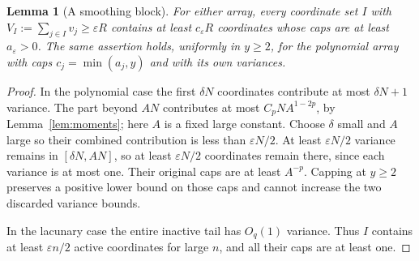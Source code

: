 \documentclass[11pt,a4paper]{article}
\numberwithin{equation}{section}
\newtheorem{lemma}[theorem]{Lemma}
\theoremstyle{definition}
\theoremstyle{remark}
\newcommand{\eps}{\varepsilon}
\begin{document}
\begin{lemma}[A smoothing block]
\label{lem:smoothing}
For either array, every coordinate set $I$ with
$V_I:=\sum_{j\in I}v_j\ge\eps R$ contains at least $c_\eps R$
coordinates whose caps are at least $a_\eps>0$. The same assertion
holds, uniformly in $y\ge2$, for the polynomial array with caps
$c_j=\min(a_j,y)$ and with its own variances.
\end{lemma}
\begin{proof}
In the polynomial case the first $\delta N$ coordinates contribute
at most $\delta N+1$ variance. The part beyond $AN$ contributes at
most $C_pNA^{1-2p}$, by Lemma~\ref{lem:moments}; here $A$ is a
fixed large constant. Choose $\delta$
small and $A$ large so their combined contribution is less than
$\eps N/2$. At least $\eps N/2$ variance remains in
$[\delta N,AN]$, so at least $\eps N/2$ coordinates remain there,
since each variance is at most one. Their original caps are at least
$A^{-p}$. Capping at $y\ge2$ preserves a positive lower bound on
those caps and cannot increase the two discarded variance bounds.

In the lacunary case the entire inactive tail has $O_q(1)$ variance.
Thus $I$ contains at least $\eps n/2$ active coordinates for large $n$,
and all their caps are at least one.
\end{proof}
\end{document}
